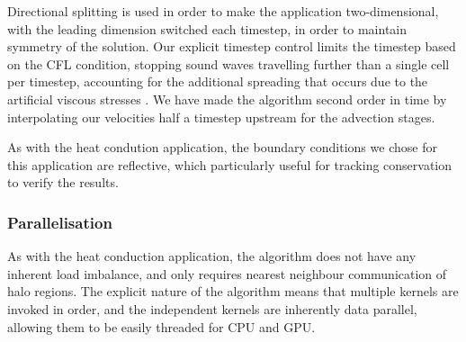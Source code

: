 \documentclass[runningheads,a4paper]{llncs}
\begin{document}
Directional splitting is used in order to make the application two-dimensional, with the leading dimension switched each timestep, in order to maintain symmetry of the solution. Our explicit timestep control limits the timestep based on the CFL condition, stopping sound waves travelling further than a single cell per timestep, accounting for the additional spreading that occurs due to the artificial viscous stresses \cite{}. We have made the algorithm second order in time by interpolating our velocities half a timestep upstream for the advection stages.

As with the heat condution application, the boundary conditions we chose for this application are reflective, which particularly useful for tracking conservation to verify the results.

\subsubsection{Parallelisation}

As with the heat conduction application, the algorithm does not have any inherent load imbalance, and only requires nearest neighbour communication of halo regions. The explicit nature of the algorithm means that multiple kernels are invoked in order, and the independent kernels are inherently data parallel, allowing them to be easily threaded for CPU and GPU.
\end{document}
